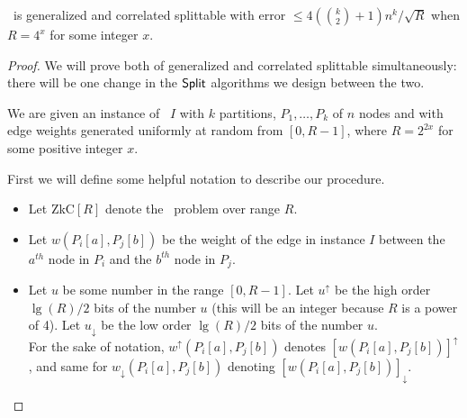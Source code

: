 \newcommand{\high}[1]{{#1}^\uparrow}
\newcommand{\low}[1]{{#1}_\downarrow}
\newcommand{\ZkC}{\mathrm{Z}$k$\mathrm{C}}

\begin{lemma}\label{lem:zkcSplitConvenientRange}
	\zkclique~is generalized and correlated splittable with error $\leq 4(\binom{k}{2} + 1) n^k/\sqrt{R}$ when $R=4^{x}$ for some integer $x$. 
\end{lemma}
\begin{proof}
	We will prove both of generalized and correlated splittable simultaneously: there will be one change in the $\mathsf{Split}$ algorithms we design between the two.
	
	We are given an instance of \zkclique~$I$ with $k$ partitions, $P_1, \ldots, P_k$ of $n$ nodes and with edge weights generated uniformly at random from $[0,R-1]$, where $R = 2^{2x}$ for some positive integer $x$.

	First we will define some helpful notation to describe our procedure.
	\begin{itemize}
		\item Let $\ZkC[R]$ denote the \zkclique~problem over range $R$.
		\item Let $w(P_i[a],P_j[b])$ be the weight of the edge in instance $I$ between the $a^{th}$ node in  $P_i$ and the $b^{th}$ node in $P_j$.
		\item Let $u$ be some number in the range $[0,R-1]$. Let $\high{u}$ be the high order $\lg(R)/2$ bits of the number $u$ (this will be an integer because $R$ is a power of 4). Let $\low {u}$ be the low order $\lg(R)/2$ bits of the number $u$.\\
		For the sake of notation, $\high w (P_i[a], P_j[b])$ denotes $\high{[w (P_i[a], P_j[b])]}$, and same for $\low w (P_i[a], P_j[b])$ denoting $\low {[w (P_i[a], P_j[b])]}$.
	\end{itemize}


\end{proof}

